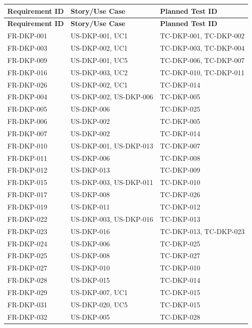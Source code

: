 \documentclass[12pt,a4paper]{report}
\begin{document}
\begin{longtable}{|p{3cm}|p{4cm}|p{3cm}|}
\hline
\textbf{Requirement ID} & \textbf{Story/Use Case} & \textbf{Planned Test ID} \\ \hline
\endfirsthead
\hline
\textbf{Requirement ID} & \textbf{Story/Use Case} & \textbf{Planned Test ID} \\ \hline
\endhead
FR-DKP-001 & US-DKP-001, UC1 & TC-DKP-001, TC-DKP-002 \\ \hline
FR-DKP-003 & US-DKP-002, UC1 & TC-DKP-003, TC-DKP-004 \\ \hline
FR-DKP-009 & US-DKP-001, UC5 & TC-DKP-006, TC-DKP-007 \\ \hline
FR-DKP-016 & US-DKP-003, UC2 & TC-DKP-010, TC-DKP-011 \\ \hline
FR-DKP-026 & US-DKP-002, UC1 & TC-DKP-014 \\ \hline
FR-DKP-004 & US-DKP-002, US-DKP-006 & TC-DKP-005 \\ \hline
FR-DKP-005 & US-DKP-006 & TC-DKP-025 \\ \hline
FR-DKP-006 & US-DKP-002 & TC-DKP-005 \\ \hline
FR-DKP-007 & US-DKP-002 & TC-DKP-014 \\ \hline
FR-DKP-010 & US-DKP-001, US-DKP-013 & TC-DKP-007 \\ \hline
FR-DKP-011 & US-DKP-006 & TC-DKP-008 \\ \hline
FR-DKP-012 & US-DKP-013 & TC-DKP-009 \\ \hline
FR-DKP-015 & US-DKP-003, US-DKP-011 & TC-DKP-010 \\ \hline
FR-DKP-017 & US-DKP-008 & TC-DKP-026 \\ \hline
FR-DKP-019 & US-DKP-011 & TC-DKP-012 \\ \hline
FR-DKP-022 & US-DKP-003, US-DKP-016 & TC-DKP-013 \\ \hline
FR-DKP-023 & US-DKP-016 & TC-DKP-013, TC-DKP-023 \\ \hline
FR-DKP-024 & US-DKP-006 & TC-DKP-025 \\ \hline
FR-DKP-025 & US-DKP-008 & TC-DKP-027 \\ \hline
FR-DKP-027 & US-DKP-010 & TC-DKP-010 \\ \hline
FR-DKP-028 & US-DKP-015 & TC-DKP-014 \\ \hline
FR-DKP-029 & US-DKP-007, UC1 & TC-DKP-015 \\ \hline
FR-DKP-031 & US-DKP-020, UC5 & TC-DKP-015 \\ \hline
FR-DKP-032 & US-DKP-005 & TC-DKP-028 \\ \hline

\end{longtable}
\end{document}
